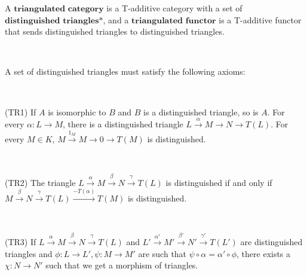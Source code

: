\documentclass[12pt]{amsart}    %
\theoremstyle{definition}
\begin{document}
A $\textbf{triangulated category}$ is a T-additive category with a set of $\textbf{distinguished triangles*}$, and a $\textbf{triangulated functor}$ is a T-additive functor that sends distinguished triangles to distinguished triangles.

\

A set of distinguished triangles must satisfy the following axioms:

\

(TR1) If $A$ is isomorphic to $B$ and $B$ is a distinguished triangle, so is $A$.  For every $\alpha: L \rightarrow M$, there is a distinguished triangle $L \xrightarrow{\alpha} M \rightarrow N \rightarrow T(L)$.  For every $M \in K$, $M \xrightarrow{1_M} M \rightarrow 0 \rightarrow T(M)$ is distinguished.

\

(TR2) The triangle $L \xrightarrow{\alpha} M \xrightarrow{\beta} N \xrightarrow{\gamma} T(L)$ is distinguished if and only if $M \xrightarrow{\beta} N \xrightarrow{\gamma} T(L) \xrightarrow{-T(\alpha)} T(M)$ is distinguished.

\

(TR3) If $L \xrightarrow{\alpha} M \xrightarrow{\beta} N \xrightarrow{\gamma} T(L)$ and $L' \xrightarrow{\alpha'} M' \xrightarrow{\beta'} N' \xrightarrow{\gamma'} T(L')$ are distinguished triangles and $\phi: L \rightarrow L', \psi: M \rightarrow M'$ are such that $\psi \circ \alpha = \alpha' \circ \phi$, there exists a $\chi: N \rightarrow N'$ such that we get a morphism of triangles.  

\


\
\end{document}
